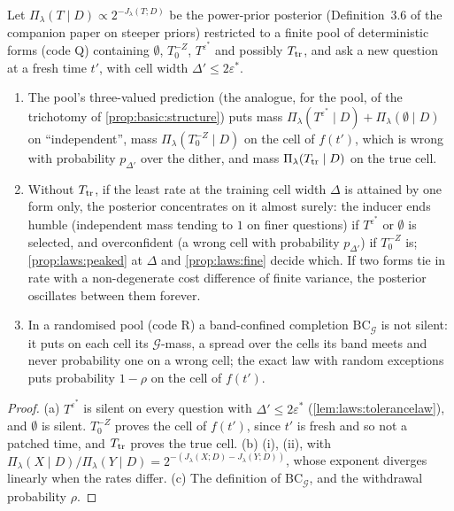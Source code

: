 \begin{proposition}[Humility]\label{prop:laws:humility}
Let $\Pi_\lambda(T\mid D)\propto2^{-J_\lambda(T;D)}$ be the power-prior posterior (Definition~3.6 of the companion paper on steeper priors) restricted to a finite pool of deterministic forms (code Q) containing $\emptyset$, $T_0^{-Z}$, $T^{\varepsilon^*}$ and possibly $T_{\rm tr}$, and ask a new question at a fresh time $t'$, with cell width $\Delta'\le2\varepsilon^*$.
\begin{enumerate}[label=(\alph*),itemsep=1pt,topsep=2pt]
\item The pool's three-valued prediction (the analogue, for the pool, of the trichotomy of \cref{prop:basic:structure}) puts mass $\Pi_\lambda(T^{\varepsilon^*}\mid D)+\Pi_\lambda(\emptyset\mid D)$ on ``independent'', mass $\Pi_\lambda(T_0^{-Z}\mid D)$ on the cell of $f(t')$, which is wrong with probability $p_{\Delta'}$ over the dither, and mass $\Pi_\lambda(T_{\rm tr}\mid D)$ on the true cell.
\item Without $T_{\rm tr}$, if the least rate at the training cell width $\Delta$ is attained by one form only, the posterior concentrates on it almost surely: the inducer ends humble (independent mass tending to $1$ on finer questions) if $T^{\varepsilon^*}$ or $\emptyset$ is selected, and overconfident (a wrong cell with probability $p_{\Delta'}$) if $T_0^{-Z}$ is; \cref{prop:laws:peaked} at $\Delta$ and \cref{prop:laws:fine} decide which. If two forms tie in rate with a non-degenerate cost difference of finite variance, the posterior oscillates between them forever.
\item In a randomised pool (code R) a band-confined completion $\mathrm{BC}_{\mathcal G}$ is not silent: it puts on each cell its $\mathcal G$-mass, a spread over the cells its band meets and never probability one on a wrong cell; the exact law with random exceptions puts probability $1-\rho$ on the cell of $f(t')$.
\end{enumerate}
\end{proposition}

\begin{proof}
(a) $T^{\varepsilon^*}$ is silent on every question with $\Delta'\le2\varepsilon^*$ (\cref{lem:laws:tolerancelaw}), and $\emptyset$ is silent. $T_0^{-Z}$ proves the cell of $f(t')$, since $t'$ is fresh and so not a patched time, and $T_{\rm tr}$ proves the true cell. (b) (i), (ii), with $\Pi_\lambda(X\mid D)/\Pi_\lambda(Y\mid D)=2^{-(J_\lambda(X;D)-J_\lambda(Y;D))}$, whose exponent diverges linearly when the rates differ. (c) The definition of $\mathrm{BC}_{\mathcal G}$, and the withdrawal probability $\rho$.
\end{proof}

